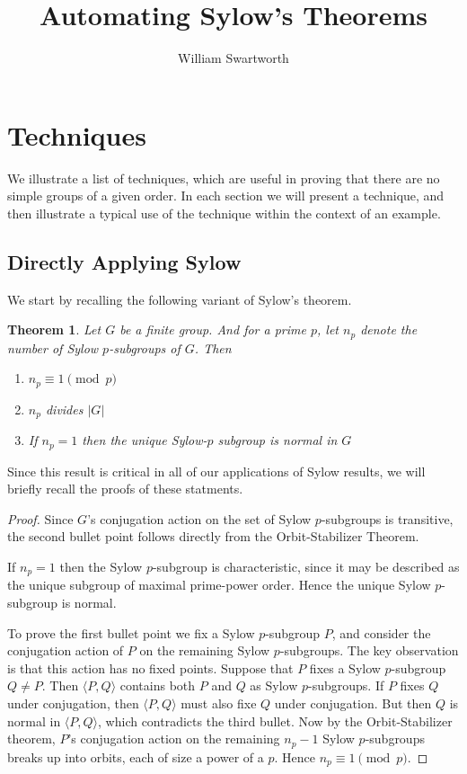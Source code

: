 \documentclass[11pt, oneside]{article}   	%
\title{Automating Sylow's Theorems}
\author{William Swartworth}
\newtheorem{theorem}{Theorem}
\begin{document}
\maketitle

\section{Techniques}

We illustrate a list of techniques, which are useful in proving that there are no simple groups of a given order.  In each section we will present a technique, and then illustrate a typical use of the technique within the context of an example.

\subsection{Directly Applying Sylow}

We start by recalling the following variant of Sylow's theorem.

\begin{theorem}
Let $G$ be a finite group.  And for a prime $p$, let $n_p$ denote the number of Sylow $p$-subgroups of $G$. Then
\begin{enumerate}
\item $n_p \equiv 1 \pmod p$
\item $n_p$ divides $|G|$
\item If $n_p = 1$ then the unique Sylow-$p$ subgroup is normal in $G$ 
\end{enumerate}
\end{theorem}

Since this result is critical in all of our applications of Sylow results, we will briefly recall the proofs of these statments.

\begin{proof}
Since $G$'s conjugation action on the set of Sylow $p$-subgroups is transitive, the second bullet point follows directly from the Orbit-Stabilizer Theorem.

If $n_p = 1$ then the Sylow $p$-subgroup is characteristic, since it may be described as the unique subgroup of maximal prime-power order.  Hence the unique Sylow $p$-subgroup is normal.

To prove the first bullet point we fix a Sylow $p$-subgroup $P$, and consider the conjugation action of $P$ on the remaining Sylow $p$-subgroups.  The key observation is that this action has no fixed points.  Suppose that 
$P$ fixes a Sylow $p$-subgroup $Q \neq P.$  Then $\langle P, Q \rangle$ contains both $P$ and $Q$ as Sylow $p$-subgroups.  If $P$ fixes $Q$ under conjugation, then $\langle P, Q \rangle$ must also fixe $Q$ under conjugation.  But then $Q$ is normal in $\langle P, Q \rangle$, which contradicts the third bullet.
Now by the Orbit-Stabilizer theorem, $P$'s conjugation action on the remaining $n_p - 1$ Sylow $p$-subgroups breaks up into orbits, each of size a power of a $p$.  Hence $n_p \equiv 1 \pmod p.$
\end{proof}
\end{document}
